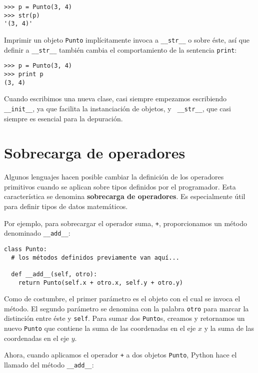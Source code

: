 \beforeverb
\begin{verbatim}
>>> p = Punto(3, 4)
>>> str(p)
'(3, 4)'
\end{verbatim}
\afterverb
%
Imprimir un objeto \texttt{Punto} implícitamente invoca a \texttt{\_\_str\_\_} o
sobre éste, así que definir a  \texttt{\_\_str\_\_} también cambia el 
comportamiento de la sentencia \texttt{print}:

\beforeverb
\begin{verbatim}
>>> p = Punto(3, 4)
>>> print p
(3, 4)
\end{verbatim}
\afterverb
%
Cuando escribimos una nueva clase, casi siempre empezamos escribiendo
 {\tt\_\_init\_\_}, ya que facilita la instanciación de objetos, y  {\tt
\_\_str\_\_}, que casi siempre es esencial para la depuración.


\section{Sobrecarga de operadores}
\label{operator overloading}

Algunos lenguajes hacen posible cambiar la definición de los
operadores primitivos cuando se aplican sobre tipos definidos
por el programador. Esta característica se denomina {\bf sobrecarga
de operadores}.  Es especialmente útil para definir tipos de 
datos matemáticos.

Por ejemplo, para sobrecargar el operador suma, \texttt{+}, 
proporcionamos un método denominado \texttt{\_\_add\_\_}:

\beforeverb
\begin{verbatim}
class Punto:
  # los métodos definidos previamente van aquí...

  def __add__(self, otro):
    return Punto(self.x + otro.x, self.y + otro.y)
\end{verbatim}
\afterverb
%
Como de costumbre, el primer parámetro es el objeto con el cual
se invoca el método. El segundo parámetro se denomina con la
palabra \texttt{otro} para marcar la distinción entre éste y
 \texttt{self}.  Para sumar dos \texttt{Punto}s, creamos
y retornamos un nuevo  \texttt{Punto} que contiene la suma
de las coordenadas en el eje $x$ y la suma de las coordenadas
en el eje $y$.

Ahora, cuando aplicamos el operador \texttt{+} a dos objetos \texttt{Punto}, Python
hace el llamado del método \texttt{\_\_add\_\_}:

